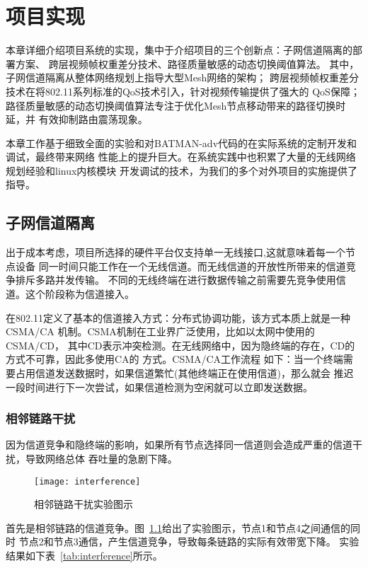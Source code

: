 \chapter{项目实现}
\label{cha:project_implement}
本章详细介绍项目系统的实现，集中于介绍项目的三个创新点：子网信道隔离的部署方案、
跨层视频帧权重差分技术、路径质量敏感的动态切换阈值算法。
其中，子网信道隔离从整体网络规划上指导大型Mesh网络的架构；
跨层视频帧权重差分技术在将802.11系列标准的QoS技术引入，针对视频传输提供了强大的
QoS保障；路径质量敏感的动态切换阈值算法专注于优化Mesh节点移动带来的路径切换时延，并
有效抑制路由震荡现象。

本章工作基于细致全面的实验和对BATMAN-adv代码的在实际系统的定制开发和调试，最终带来网络
性能上的提升巨大。在系统实践中也积累了大量的无线网络规划经验和linux内核模块
开发调试的技术，为我们的多个对外项目的实施提供了指导。

\section{子网信道隔离}
\label{sec:1}
出于成本考虑，项目所选择的硬件平台仅支持单一无线接口,这就意味着每一个节点设备
同一时间只能工作在一个无线信道。而无线信道的开放性所带来的信道竞争排斥多路并发传输。
不同的无线终端在进行数据传输之前需要先竞争使用信道。这个阶段称为信道接入。

在802.11定义了基本的信道接入方式：分布式协调功能，该方式本质上就是一种CSMA/CA
机制。CSMA机制在工业界广泛使用，比如以太网中使用的CSMA/CD，
其中CD表示冲突检测。在无线网络中，因为隐终端的存在，CD的方式不可靠，因此多使用CA的
方式。CSMA/CA工作流程
如下：当一个终端需要占用信道发送数据时，如果信道繁忙(其他终端正在使用信道)，那么就会
推迟一段时间进行下一次尝试，如果信道检测为空闲就可以立即发送数据。

\subsection{相邻链路干扰}
因为信道竞争和隐终端的影响，如果所有节点选择同一信道则会造成严重的信道干扰，导致网络总体
吞吐量的急剧下降。
\begin{figure}[H] %
  \centering
  \texttt{[image: interference]}
  \caption{相邻链路干扰实验图示}
  \label{fig:interference}
\end{figure}

首先是相邻链路的信道竞争。图~\ref{fig:interference}给出了实验图示，节点1和节点4之间通信的同时
节点2和节点3通信，产生信道竞争，导致每条链路的实际有效带宽下降。
实验结果如下表~\ref{tab:interference}所示。

